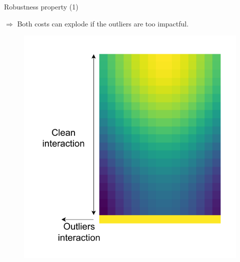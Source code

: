 \documentclass{beamer}
\begin{document}
\begin{frame}{Robustness property (1)}
  \begin{minipage}[t]{0.7\linewidth}
    $\Rightarrow$ Both costs can explode if the outliers are too impactful.
  \end{minipage}%
    \hfill%
    \hspace{-6cm}
    \begin{minipage}[t]{0.35\linewidth}
      \vspace{-0.5cm}
    \begin{figure}
      \centering
      \includegraphics[width=1.1\linewidth, keepaspectratio=true]{OT_new/noisy_toy.pdf}
    \end{figure}
  \end{minipage}


\end{frame}
\end{document}

